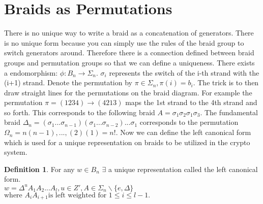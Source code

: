 \documentclass{article}
\theoremstyle{definition}
\newtheorem{definition}{Definition}[section]
\begin{document}
\section{Braids as Permutations}
	There is no unique way to write a braid as a concatenation of generators. There is no unique form because you can simply use the rules of the braid group to switch generators around. Therefore there is a connection defined between braid groups and permutation groups so that we can define a uniqueness. There exists a endomorphism:
	$ \phi: B_n \rightarrow \Sigma_n$.
	$\sigma_i $ represents the switch of the i-th strand with the (i+1) strand. 
	Denote the permutation by $\pi \in \Sigma_n, \pi(i)=b_i$. The trick is to then draw straight lines for the permutations on the braid diagram. For example the permutation $\pi=(1 2 3 4)\rightarrow(4 2 1 3)$ maps the 1st strand to the 4th strand and so forth. This corresponds to the following braid $A=\sigma_1 \sigma_2 \sigma_1 \sigma_3$. The fundamental braid $\Delta_n=(\sigma_1...\sigma_{n-1})(\sigma_1 ... \sigma_{n-2})...\sigma_1 $ corresponds to the permutation $\Omega_n=n(n-1),...,(2)(1)=n!$. Now we can define the left canonical form which is used for a unique representation on braids to be utilized in the crypto system.
	
	\begin{definition}	
	For any $w \in B_n$ $\exists$ a unique representation called the left canonical form.
	\\$w = \Delta^u A_1 A_2 ... A_l, u \in Z', A \in \Sigma_n \backslash \{ e, \Delta \} $
	$\text{where } A_i A_{i+1} \text{is left weighted for } 1 \leq i \leq l - 1.$
	\end{definition}
	
\end{document}
